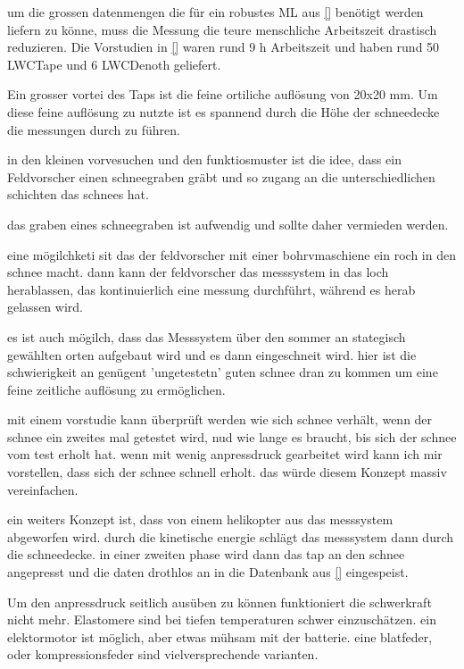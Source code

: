 um die grossen datenmengen die für ein robustes ML aus \ref{} benötigt werden liefern zu könne, muss die Messung die teure menschliche Arbeitszeit drastisch reduzieren. Die Vorstudien in \ref{} waren rund 9 h Arbeitszeit und haben rund 50 LWCTape und 6 LWCDenoth geliefert.

Ein grosser vortei des Taps ist die feine ortiliche auflösung von 20x20 mm. Um diese feine auflösung zu nutzte ist es spannend durch die Höhe der schneedecke die messungen durch zu führen.

in den kleinen vorvesuchen und den funktiosmuster ist die idee, dass ein Feldvorscher einen schneegraben gräbt und so zugang an die unterschiedlichen schichten das schnees hat.

das graben eines schneegraben ist aufwendig und sollte daher vermieden werden.

eine mögilchketi sit das der feldvorscher mit einer bohrvmaschiene ein roch in den schnee macht. dann kann der feldvorscher das messsystem in das loch herablassen, das kontinuierlich eine messung durchführt, während es herab gelassen wird.

es ist auch mögilch, dass das Messsystem über den sommer an stategisch gewählten orten aufgebaut wird und es dann eingeschneit wird. hier ist die schwierigkeit an genügent 'ungetestetn' guten schnee dran zu kommen um eine feine zeitliche auflösung zu ermöglichen.

mit einem vorstudie kann überprüft werden wie sich schnee verhält, wenn der schnee ein zweites mal getestet wird, nud wie lange es braucht, bis sich der schnee vom test erholt hat. wenn mit wenig anpressdruck gearbeitet wird kann ich mir vorstellen, dass sich der schnee schnell erholt. das würde diesem Konzept massiv vereinfachen.

ein weiters Konzept ist, dass von einem helikopter aus das messsystem abgeworfen wird. durch die kinetische energie schlägt das messsystem dann durch die schneedecke. in einer zweiten phase wird dann das tap an den schnee angepresst und die daten drothlos an in die Datenbank aus \ref{} eingespeist.

Um den anpressdruck seitlich ausüben zu können funktioniert die schwerkraft nicht mehr. Elastomere sind bei tiefen temperaturen schwer einzuschätzen. ein elektormotor ist möglich, aber etwas mühsam mit der batterie. eine blatfeder, oder kompressionsfeder sind vielversprechende varianten.
